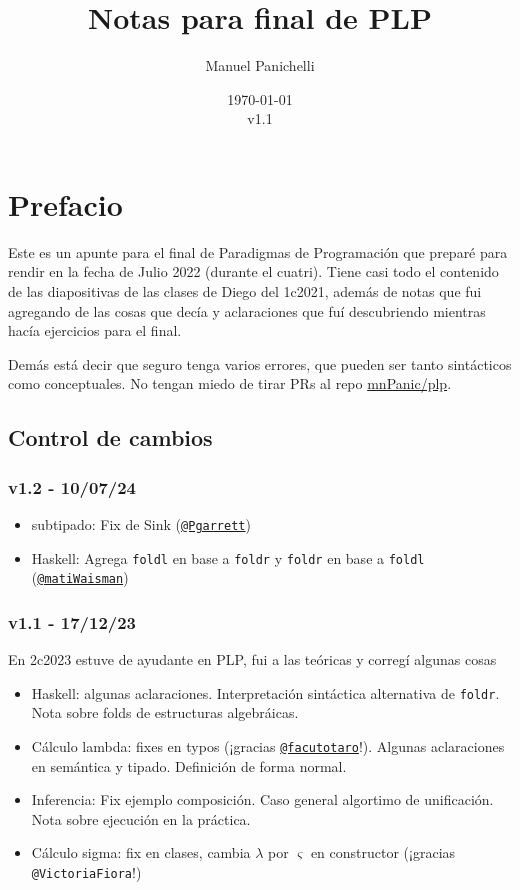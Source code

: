 \documentclass{report}
\author{Manuel Panichelli}
\title{Notas para final de PLP}
\date{\today\\v1.1}
\theoremstyle{definition} %
\begin{document}
\maketitle

\tableofcontents

\chapter*{Prefacio}

Este es un apunte para el final de Paradigmas de Programación que preparé para
rendir en la fecha de Julio 2022 (durante el cuatri). Tiene casi todo el
contenido de las diapositivas de las clases de Diego del 1c2021, además de notas
que fui agregando de las cosas que decía y aclaraciones que fuí descubriendo
mientras hacía ejercicios para el final.

Demás está decir que seguro tenga varios errores, que pueden ser tanto
sintácticos como conceptuales. No tengan miedo de tirar PRs al repo \href{https://github.com/mnPanic/plp}{mnPanic/plp}.

\section*{Control de cambios}

\newcommand{\ghuser}[1]{\href{https://github.com/#1}{\texttt{@#1}}}

\subsection*{v1.2 - 10/07/24}

\begin{itemize}
    \item subtipado: Fix de Sink (\ghuser{Pgarrett})
    \item Haskell: Agrega \texttt{foldl} en base a \texttt{foldr} y
    \texttt{foldr} en base a \texttt{foldl} (\ghuser{matiWaisman})
\end{itemize}

\subsection*{v1.1 - 17/12/23}

En 2c2023 estuve de ayudante en PLP, fui a las teóricas y corregí algunas cosas 

\begin{itemize}
    \item Haskell: algunas aclaraciones. Interpretación sintáctica alternativa
    de \texttt{foldr}. Nota sobre folds de estructuras algebráicas.
    \item Cálculo lambda: fixes en typos (¡gracias
    \href{https://github.com/facutotaro}{\texttt{@facutotaro}}!). Algunas
    aclaraciones en semántica y tipado. Definición de forma normal.
    \item Inferencia: Fix ejemplo composición. Caso general algortimo de
    unificación. Nota sobre ejecución en la práctica.
    \item Cálculo sigma: fix en clases, cambia $\lambda$ por $\varsigma$ en constructor (¡gracias \texttt{@VictoriaFiora}!)
\end{itemize}
\end{document}
